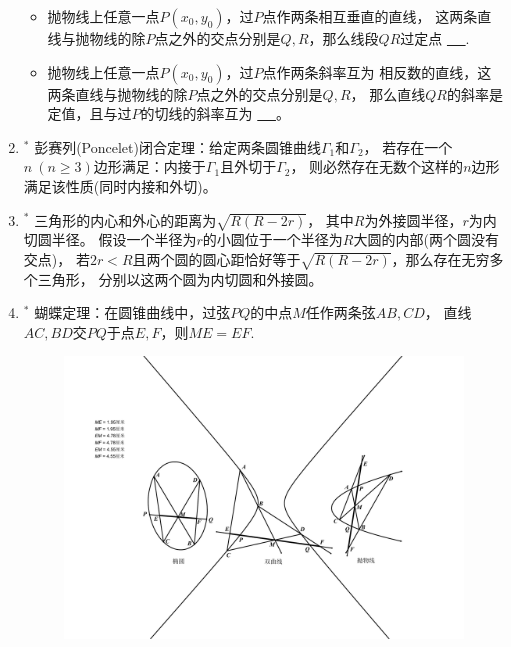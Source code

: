 \documentclass{article}
\newif\ifte
\renewcommand\geq\geqslant
\begin{document}
\begin{multicols}{2}
\begin{enumerate}[leftmargin=20pt]
\begin{itemize}[leftmargin=-4pt]
\item 抛物线上任意一点$ P(x_0,y_0) $，过$ P $点作两条相互垂直的直线，
这两条直线与抛物线的除$ P $点之外的交点分别是$ Q,R $，那么线段$ QR $过定点
\underline{\ \ifte $ (x_0+2p,-y_0) $\else \hspace{2cm} \fi\ }.

\item 抛物线上任意一点$ P(x_0,y_0) $，过$ P $点作两条斜率互为
相反数的直线，这两条直线与抛物线的除$ P $点之外的交点分别是$ Q,R $，
那么直线$ QR $的斜率是定值，且与过$ P $的切线的斜率互为
\underline{\ \ifte 相反数\else \hspace{2cm} \fi\ }。


\end{itemize}

\item $^*$ 彭赛列(Poncelet)闭合定理：给定两条圆锥曲线$ \Gamma_1 $和$ \Gamma_2 $，
若存在一个$ n\ (n\geq 3) $边形满足：内接于$ \Gamma_1 $且外切于$ \Gamma_2 $，
则必然存在无数个这样的$ n $边形满足该性质(同时内接和外切)。

\item $^*$ 三角形的内心和外心的距离为$ \sqrt{R(R-2r)} $，
其中$ R $为外接圆半径，$ r $为内切圆半径。
假设一个半径为$ r $的小圆位于一个半径为$ R $大圆的内部(两个圆没有交点)，
若$ 2r<R $且两个圆的圆心距恰好等于$ \sqrt{R(R-2r)} $，那么存在无穷多个三角形，
分别以这两个圆为内切圆和外接圆。

\item $^*$ 蝴蝶定理：在圆锥曲线中，过弦$ PQ $的中点$ M $任作两条弦$ AB,CD $，
直线$ AC,BD $交$ PQ $于点$ E,F $，则$ ME=EF $.
\begin{figure}[H]
    \centering
    \includegraphics[width=0.95\linewidth]{蝴蝶定理}
\end{figure}



\end{enumerate}
\end{multicols}
\end{document}
